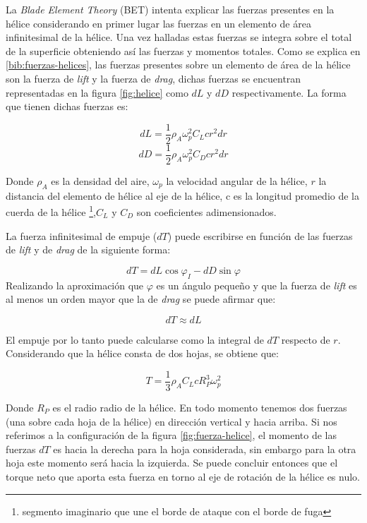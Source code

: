 \documentclass[main]{subfiles}
\begin{document}
La \emph{Blade Element Theory} (BET) intenta explicar las fuerzas presentes en la h\'elice considerando en primer lugar las fuerzas en un elemento de \'area infinitesimal de la h\'elice. Una vez halladas estas fuerzas se integra sobre el total de la superficie obteniendo as\'i las fuerzas y momentos totales. Como se explica en \ref{bib:fuerzas-helices}, las fuerzas presentes sobre un elemento de \'area de la h\'elice son la fuerza de \emph{lift} y la fuerza de \emph{drag}, dichas fuerzas se encuentran representadas en la figura \ref{fig:helice} como $dL$ y $dD$ respectivamente. La forma que tienen dichas fuerzas es:

\begin{equation}
dL=\frac{1}{2}\rho_A \omega_p^2 C_L c r^2dr
\end{equation}
\begin{equation}
dD=\frac{1}{2}\rho_A \omega_p^2 C_D c r^2dr
\end{equation}

Donde $\rho_A$ es la densidad del aire, $\omega_p$ la velocidad angular de la h\'elice, $r$ la distancia del elemento de h\'elice al eje de la h\'elice, c es la longitud promedio de la cuerda de la h\'elice \footnote{segmento imaginario que une el borde de ataque con el borde de fuga },$ C_L$ y $C_D$ son coeficientes adimensionados.

La fuerza infinitesimal de empuje ($dT$) puede escribirse en funci\'on de las fuerzas de \emph{lift} y de \emph{drag} de la siguiente forma:

\begin{equation}
dT=dL\cos\varphi_I-dD\sin\varphi
\end{equation}
Realizando la aproximaci\'on que $\varphi$ es un \'angulo peque\~no y que la fuerza de \emph{lift} es al menos un orden mayor que la de \emph{drag} se puede afirmar que:

\begin{equation}
dT\approx dL
\end{equation}

El empuje por lo tanto puede calcularse como la integral de $dT$ respecto de $r$. Considerando que la h\'elice consta de dos hojas, se obtiene que:

\begin{equation}
\label{eq:fuerza}
T=\frac{1}{3}\rho_A C_L c R_P^3\omega_p^2
\end{equation}


Donde $R_P$ es el radio radio de la h\'elice. En todo momento tenemos dos fuerzas (una sobre cada hoja de la h\'elice) en direcci\'on vertical y hacia arriba. Si nos referimos a la configuraci\'on de la figura \ref{fig:fuerza-helice}, el momento de las fuerzas $dT$ es hacia la derecha para la hoja considerada, sin embargo para la otra hoja este momento ser\'a hacia la izquierda. Se puede concluir entonces que el torque neto que aporta esta fuerza en torno al eje de rotaci\'on de la h\'elice es nulo.\\   
\end{document}
